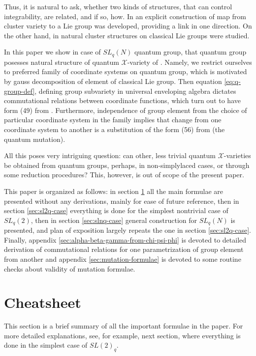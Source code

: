 \documentclass{article}
\newcommand {\?}{\textit{???}}
\def\Chi{\mathcal{X}}
\begin{document}
Thus, it is natural to ask, whether two kinds of structures, that can control integrability,
are related, and if so, how. In \cite{FG2} an explicit construction of map from cluster variety
to a Lie group was developed, providing a link in one direction. On the other hand,
in \cite{GShV} natural cluster structures on classical Lie groups were studied.

In this paper we show in case of $SL_q(N)$ quantum group, that quantum group posesses natural
structure of quantum $\Chi$-variety of \cite{FG1}. Namely, we restrict ourselves to preferred
family of coordinate systems on quantum group, which is motivated by gauss decomposition of
element of classical Lie group. Then equation \eqref{eq:q-group-def},
 defining group subvariety in universal enveloping algebra dictates commutational
relations between coordinate functions, which turn out to have form (49) from \cite{FG1}.
Furthermore, independence of group element from the choice of particular coordinate system
 in the family implies that change from one coordinate system to another
is a substitution of the form (56) from \cite{FG1} (the quantum mutation).

All this poses very intriguing question: can other, less trivial quantum $\Chi$-varieties be
obtained from quantum groups, perhaps, in non-simplylaced cases, or through some reduction procedures?
This, however, is out of scope of the present paper.

This paper is organized as follows: in section \ref{sec:cheatsheet} all the main formulae are
presented without any derivations, mainly for ease of future reference, then
in section \ref{sec:sl2q-case} everything is done for the simplest nontrivial case of $SL_q(2)$,
then in section \ref{sec:slnq-case} general construction for $SL_q(N)$ is presented, and plan
of exposition largely repeats the one in section \ref{sec:sl2q-case}. Finally,
appendix \ref{sec:alpha-beta-gamma-from-chi-psi-phi} is devoted to detailed derivation of commutational
relations for one parametrization of group element from another and appendix \ref{sec:mutation-formulae}
is devoted to some routine checks about validity of mutation formulae.


\section{Cheatsheet}
\label{sec:cheatsheet}

This section is a brief summary of all the important formulae in the paper.
For more detailed explanations, see, for example, next section, where everything is
 done in the simplest case of $SL(2)_q$.
\end{document}
